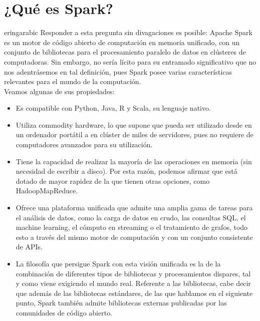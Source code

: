 \chapter{¿Qué es Spark?}
ering{arabic}
Responder a esta pregunta sin divagaciones es posible: Apache Spark es un motor de código abierto de computación en memoria unificado, con un conjunto de bibliotecas para el procesamiento paralelo de datos en clústeres de computadoras. Sin embargo, no sería lícito para su entramado significativo que no nos adentrásemos en tal definición, pues Spark  posee varias características  relevantes para el mundo de la computación.\\

Veamos algunas de sus propiedades:\\

\begin{itemize}
\item Es compatible con Python, Java, R y Scala, su lenguaje nativo.\\

\item Utiliza commodity hardware, lo que supone que pueda ser utilizado desde en un ordenador portátil a en clúster de miles de servidores, pues no requiere de computadores avanzados para su utilización.\\

\item Tiene la capacidad de realizar la mayoría de las operaciones en memoria (sin necesidad de escribir a disco). Por esta razón, podemos afirmar que está dotado de mayor rapidez de la que tienen otras opciones, como HadoopMapReduce.\\

\item Ofrece una plataforma unificada que admite una amplia gama de tareas para el análisis de datos, como la carga de datos en crudo, las consultas SQL, el machine learning, el cómputo en streaming o el tratamiento de grafos, todo esto a través del mismo motor de computación y con un conjunto consistente de APIs. \\

\item La filosofía que persigue Spark con esta visión unificada es la de la combinación de diferentes tipos de bibliotecas y procesamientos dispares, tal y como viene exigiendo el mundo real. Referente a las bibliotecas, cabe decir que además de las bibliotecas estándares, de las que hablamos en el siguiente punto, Spark también admite bibliotecas externas publicadas por las comunidades de código abierto.\\


\end{itemize}
